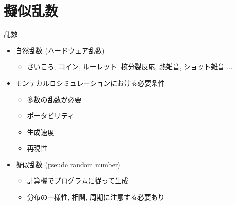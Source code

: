 \documentclass[dvipdfmx]{beamer}
\begin{document}
\section{擬似乱数}

\begin{frame}[t,fragile]{乱数}
  \begin{itemize}
    \setlength{\itemsep}{1em}
  \item 自然乱数 (ハードウェア乱数)
    \begin{itemize}
    \item さいころ, コイン, ルーレット, 核分裂反応, 熱雑音, ショット雑音 ...
    \end{itemize}
  \item モンテカルロシミュレーションにおける必要条件
    \begin{itemize}
    \item 多数の乱数が必要
    \item ポータビリティ
    \item 生成速度
    \item 再現性
    \end{itemize}
  \item 擬似乱数 (pseudo random number)
    \begin{itemize}
    \item 計算機でプログラムに従って生成
    \item 分布の一様性, 相関, 周期に注意する必要あり
    \end{itemize}
  \end{itemize}
\end{frame}
\end{document}
